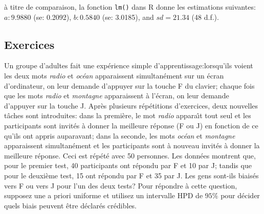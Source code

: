 \begin{Exemple}
\begin{center}
\end{center}
\`a titre de comparaison, la fonction \texttt{lm()} dans R donne les estimations suivantes: $a: 9.9880$ (se: 0.2092), $b: 0.5840$ (se: 3.0185), and $sd = 21.34$ (48 d.f.).
\end{Exemple}

\subsection*{Exercices}
\begin{Exercice} Un groupe d'adultes fait une exp\'erience simple d'apprentissage:lorsqu'ils voient les deux mots \textit{radio} et \textit{oc\'ean}  apparaissent simultan\'ement sur un \'ecran d'ordinateur, on leur demande d'appuyer sur la touche F du clavier; chaque fois que les mots \textit{radio} et \textit{montagne} apparaissent \`a l'\'ecran, on leur demande d'appuyer sur la touche J.  Apr\`es plusieurs r\'ep\'etitions d'exercices, deux nouvelles tâches sont introduites: dans la premi\`ere, le mot \textit{radio} appara\^{\i}t tout seul et les participants sont invit\'es \`a donner la meilleure r\'eponse (F ou J) en fonction de ce qu'ils ont appris auparavant; dans la seconde, les mots \textit{oc\'ean} et \textit{montagne} apparaissent simultan\'ement et les participants sont \`a nouveau invit\'es \`a donner la meilleure r\'eponse. Ceci est r\'ep\'et\'e avec 50 personnes. Les donn\'ees montrent que, pour le premier test, 40 participants ont r\'epondu par F et 10 par J; tandis que pour le deuxi\`eme test, 15 ont r\'epondu par F et 35 par J. Les gens sont-ils biais\'es vers F ou vers J pour l'un des deux tests? Pour r\'epondre \`a cette question, supposez une a priori uniforme et utilisez un intervalle HPD de $95\%$ pour d\'ecider quels biais peuvent être d\'eclar\'es cr\'edibles.
\label{ex4.2.1} 
\end{Exercice}


